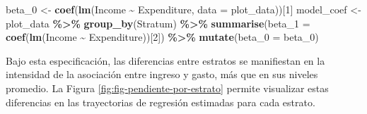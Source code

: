 \documentclass[
  spanish,
  12pt,
]{book}
\newenvironment{Shaded}{\begin{snugshade}}{\end{snugshade}}
\newcommand{\AttributeTok}[1]{\textcolor[rgb]{0.13,0.29,0.53}{#1}}
\newcommand{\DecValTok}[1]{\textcolor[rgb]{0.00,0.00,0.81}{#1}}
\newcommand{\FloatTok}[1]{\textcolor[rgb]{0.00,0.00,0.81}{#1}}
\newcommand{\FunctionTok}[1]{\textcolor[rgb]{0.13,0.29,0.53}{\textbf{#1}}}
\newcommand{\NormalTok}[1]{#1}
\newcommand{\OtherTok}[1]{\textcolor[rgb]{0.56,0.35,0.01}{#1}}
\newcommand{\SpecialCharTok}[1]{\textcolor[rgb]{0.81,0.36,0.00}{\textbf{#1}}}
\newcommand{\StringTok}[1]{\textcolor[rgb]{0.31,0.60,0.02}{#1}}
\newcounter{none} %
\begin{document}
\begin{Shaded}
\begin{Highlighting}[]
\NormalTok{beta\_0 }\OtherTok{\textless{}{-}} \FunctionTok{coef}\NormalTok{(}\FunctionTok{lm}\NormalTok{(Income }\SpecialCharTok{\textasciitilde{}}\NormalTok{ Expenditure, }\AttributeTok{data =}\NormalTok{ plot\_data))[}\DecValTok{1}\NormalTok{]}
\NormalTok{model\_coef }\OtherTok{\textless{}{-}}\NormalTok{ plot\_data }\SpecialCharTok{\%\textgreater{}\%}
  \FunctionTok{group\_by}\NormalTok{(Stratum) }\SpecialCharTok{\%\textgreater{}\%}
  \FunctionTok{summarise}\NormalTok{(}\AttributeTok{beta\_1 =} \FunctionTok{coef}\NormalTok{(}\FunctionTok{lm}\NormalTok{(Income }\SpecialCharTok{\textasciitilde{}}\NormalTok{ Expenditure))[}\DecValTok{2}\NormalTok{]) }\SpecialCharTok{\%\textgreater{}\%}
  \FunctionTok{mutate}\NormalTok{(}\AttributeTok{beta\_0 =}\NormalTok{ beta\_0)}
\end{Highlighting}
\end{Shaded}

Bajo esta especificación, las diferencias entre estratos se manifiestan en la intensidad de la asociación entre ingreso y gasto, más que en sus niveles promedio. La Figura \ref{fig:fig-pendiente-por-estrato} permite visualizar estas diferencias en las trayectorias de regresión estimadas para cada estrato.

\begin{Shaded}
\end{Shaded}
\end{document}
